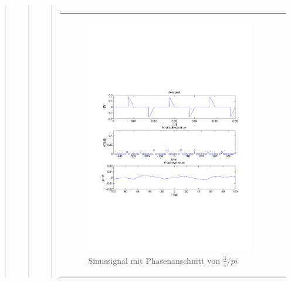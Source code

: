 \begin{quote}
\begin{quote}
\begin{quote}
\begin{center}
\begin{tabular}{ll}
                \end{tabular}
                \end{center}
    
                \begin{center}
                \begin{tabular}{ll}
    
                \hspace{-11em}
                    \begin{minipage}{0.6\textwidth}
    
                        \begin{figure}[H]
                            \label{fig:}
                            \includegraphics[scale=0.5, trim = 1.5cm 7cm 1.5cm 8.5cm,
                            clip]{./Bilder/Phasenanschnitt68pi.pdf} %
                            \caption{Sinussignal mit Phasenanschnitt von $\frac{3}{4}/pi$}
                        \end{figure}
    

\end{minipage}
\end{tabular}
\end{center}
\end{quote}
\end{quote}
\end{quote}
